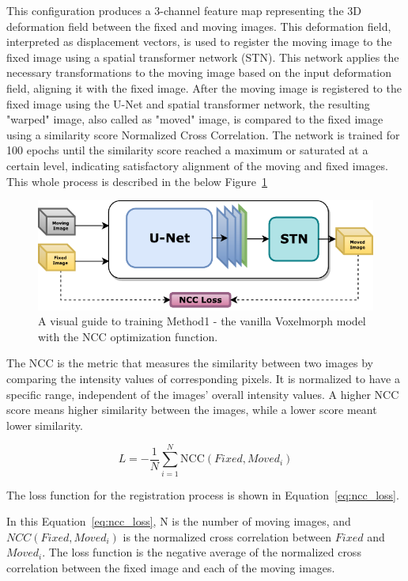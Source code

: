 \documentclass{report}
\begin{document}
	This configuration produces a 3-channel feature map representing the 3D deformation field between the fixed and moving images. This deformation field, interpreted as displacement vectors, is used to register the moving image to the fixed image using a spatial transformer network (STN). This network applies the necessary transformations to the moving image based on the input deformation field, aligning it with the fixed image. After the moving image is registered to the fixed image using the U-Net and spatial transformer network, the resulting "warped" image, also called as "moved" image, is compared to the fixed image using a similarity score Normalized Cross Correlation. The network is trained for 100 epochs until the similarity score reached a maximum or saturated at a certain level, indicating satisfactory alignment of the moving and fixed images. This whole process is described in the below Figure~\ref{fig:block_method1}
	
	\begin{figure}[h!]
		\centering
		\includegraphics{resources/chapter4/methods/method1.pdf}
		\caption{A visual guide to training Method1 - the vanilla Voxelmorph model with the NCC optimization function.}
		\label{fig:block_method1}
	\end{figure}
	
	The NCC is the metric that measures the similarity between two images by comparing the intensity values of corresponding pixels. It is normalized to have a specific range, independent of the images' overall intensity values. A higher NCC score means higher similarity between the images, while a lower score meant lower similarity.
	
	\begin{equation}\label{eq:ncc_loss}
	L = -\frac{1}{N} \sum_{i=1}^N \text{NCC}(Fixed, Moved_i)
	\end{equation}
	
	The loss function for the registration process is shown in Equation~\ref{eq:ncc_loss}.
	
	In this Equation~\ref{eq:ncc_loss}, N is the number of moving images, and $NCC(Fixed, Moved_i)$ is the normalized cross correlation between $Fixed$ and $Moved_i$. The loss function is the negative average of the normalized cross correlation between the fixed image and each of the moving images.
	
\end{document}
